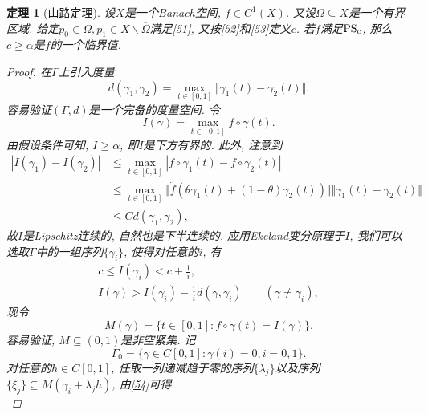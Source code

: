 \documentclass[12pt,a4paper]{article}
\newtheorem{theorem}{定理}[section]
\begin{document}
\begin{theorem}[山路定理]
    设$X$是一个Banach空间, $f \in C^1(X)$. 又设$\Omega \subseteq X$是一个有界区域.
    给定$p_0 \in \Omega, p_1 \in X \smallsetminus \overline{\Omega}$满足\eqref{51}, 又按\eqref{52}和\eqref{53}定义$c$.
    若$f$满足${\rm PS_c}$, 那么$c \geq \alpha$是$f$的一个临界值.
    \begin{proof}
        在$\Gamma$上引入度量 
        \begin{equation*}
            d(\gamma_1, \gamma_2) = \max_{t \in [0, 1]}\Vert \gamma_1(t) - \gamma_2(t)\Vert.
        \end{equation*}
        容易验证$(\Gamma, d)$是一个完备的度量空间. 令 
        \begin{equation*}
            I(\gamma) = \max_{t \in [0, 1]}f \circ \gamma(t).
        \end{equation*}
        由假设条件可知, $I \geq \alpha$, 即$I$是下方有界的. 此外, 注意到 
        \begin{align*}
            |I(\gamma_1) - I(\gamma_2)| &\leq \max_{t \in [0, 1]}|f \circ \gamma_1(t) - f \circ \gamma_2(t)| \\ 
            &\leq \max_{t \in [0, 1]}\Vert \dot f(\theta\gamma_1(t) + (1 - \theta)\gamma_2(t))\Vert \Vert \gamma_1(t) - \gamma_2(t)\Vert \\ 
            &\leq Cd(\gamma_1, \gamma_2),
        \end{align*}
        故$I$是Lipschitz连续的, 自然也是下半连续的. 应用Ekeland变分原理于$I$, 我们可以选取$\Gamma$中的一组序列$\{\gamma_i\}$, 使得对任意的$i$, 有 
        \begin{gather}
            c \leq I(\gamma_i) < c + \frac{1}{i}, \label{54} \\ 
            I(\gamma) > I(\gamma_i) - \frac{1}{i}d(\gamma, \gamma_i) \qquad (\gamma \neq \gamma_i) \label{55},
        \end{gather}
        现令 
        \begin{equation*}
            M(\gamma) = \{t \in [0, 1]\colon f \circ \gamma(t) = I(\gamma)\}.
        \end{equation*}
        容易验证, $M \subseteq (0, 1)$是非空紧集. 记
        \begin{equation*}
            \Gamma_0 = \{\gamma \in C[0, 1]\colon \gamma(i) = 0, i = 0, 1\}.
        \end{equation*}
        对任意的$h \in C[0, 1]$, 任取一列递减趋于零的序列$\{\lambda_j\}$以及序列$\{\xi_j\} \subseteq M(\gamma_i + \lambda_jh)$, 由\eqref{54}可得 
        \begin{equation*}

\end{equation*}
\end{proof}
\end{theorem}
\end{document}

